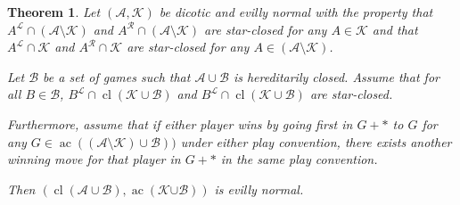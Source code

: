 \documentclass{amsart}
\theoremstyle{plain}
\newtheorem{thm}{Theorem}
\theoremstyle{definition}
\theoremstyle{remark}
\numberwithin{equation}{section}
\numberwithin{thm}{section}
\DeclareMathOperator{\cl}{cl}
\DeclareMathOperator{\ac}{ac}
\begin{document}
\begin{thm}
\label{add to a- (a-k)}
   Let $(\mathscr{A},\mathscr{K})$ be dicotic and evilly normal with the property that $A^\mathcal{L} \cap (\mathscr{A}\setminus\mathscr{K})$ and $A^\mathcal{R} \cap (\mathscr{A}\setminus\mathscr{K})$ are star-closed for any $A \in \mathscr{K}$ and that $A^{\mathcal{L}}\cap \mathscr{K}$ and $A^{\mathcal{R}}\cap \mathscr{K}$ are star-closed for any $A \in (\mathscr{A} \setminus \mathscr{K})$.
    
Let $\mathscr{B}$ be a set of games such that $\mathscr{A} \cup \mathscr{B}$ is hereditarily closed. Assume that for all $B \in \mathscr{B}$, $B^\mathcal{L{}} \cap \cl(\mathscr{K} \cup \mathscr{B})$ and $B^\mathcal{L{}} \cap \cl(\mathscr{K} \cup \mathscr{B})$ are star-closed.

Furthermore, assume that if either player wins by going first in $G+*$ to $G$ for any $G\in \ac( (\mathscr{A}\setminus \mathscr{K} )\cup \mathscr{B})) $ under either play convention, there exists another winning move for that player in $G+*$ in the same play convention.
   
   Then $(\cl(\mathscr{A}\cup \mathscr{B}), \ac(\mathscr{K{ \cup \mathscr{B}}}))$ is evilly normal.
\end{thm}
\end{document}
